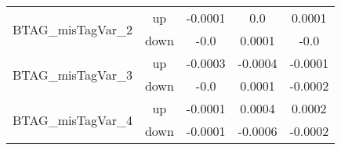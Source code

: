 \begin{table}[h!]
\begin{tabular}{lcccc}
\multirow{2}{*}{BTAG\_misTagVar\_2}      & up   &     -0.0001     &     0.0     &     0.0001      \\
                                       & down &     -0.0     &     0.0001     &     -0.0       \\ \hline
\multirow{2}{*}{BTAG\_misTagVar\_3}      & up   &     -0.0003     &     -0.0004     &     -0.0001      \\
                                       & down &     -0.0     &     0.0001     &     -0.0002       \\ \hline
\multirow{2}{*}{BTAG\_misTagVar\_4}      & up   &     -0.0001     &     0.0004     &     0.0002      \\
                                       & down &     -0.0001     &     -0.0006     &     -0.0002       \\ \hline


\end{tabular}

\label{tab:systUnc_lep_fl}
\end{table}


